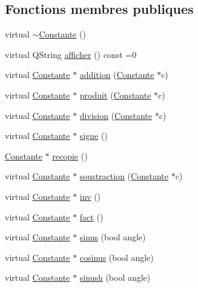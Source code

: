 \subsection*{\-Fonctions membres publiques}
\begin{DoxyCompactItemize}
\item 
virtual \hyperlink{class_constante_af747f270ad3d50813786a1b013bac959}{$\sim$\-Constante} ()
\item 
virtual \-Q\-String \hyperlink{class_constante_a78b5d9ee6a7e70349db6641a08f77479}{afficher} () const =0
\item 
virtual \hyperlink{class_constante}{\-Constante} $\ast$ \hyperlink{class_constante_a243b6eabd1fd476af827c5b523cddfac}{addition} (\hyperlink{class_constante}{\-Constante} $\ast$c)
\item 
virtual \hyperlink{class_constante}{\-Constante} $\ast$ \hyperlink{class_constante_a650e88b74d2f8a052e6a11363b3ec816}{produit} (\hyperlink{class_constante}{\-Constante} $\ast$c)
\item 
virtual \hyperlink{class_constante}{\-Constante} $\ast$ \hyperlink{class_constante_ac41fa56ac5ebdfbcc886b8d249fb876d}{division} (\hyperlink{class_constante}{\-Constante} $\ast$c)
\item 
virtual \hyperlink{class_constante}{\-Constante} $\ast$ \hyperlink{class_constante_a59fcc22949ea02eb02244dad693696aa}{signe} ()
\item 
\hyperlink{class_constante}{\-Constante} $\ast$ \hyperlink{class_constante_ac6fb071229429f82cf489f8313461efa}{recopie} ()
\item 
virtual \hyperlink{class_constante}{\-Constante} $\ast$ \hyperlink{class_constante_a3f3e5ad91d9e4eef33a5e6955fe91cb5}{soustraction} (\hyperlink{class_constante}{\-Constante} $\ast$c)
\item 
virtual \hyperlink{class_constante}{\-Constante} $\ast$ \hyperlink{class_constante_a5ea6dd472ce568576961fa78b3b674b5}{inv} ()
\item 
virtual \hyperlink{class_constante}{\-Constante} $\ast$ \hyperlink{class_constante_a96e23d33bd45f79589f8911473ef2e32}{fact} ()
\item 
virtual \hyperlink{class_constante}{\-Constante} $\ast$ \hyperlink{class_constante_a3b6827eba7936c4ce61f64da9dd826b4}{sinus} (bool angle)
\item 
virtual \hyperlink{class_constante}{\-Constante} $\ast$ \hyperlink{class_constante_af6784ed749b7f2be92d6017628e5b935}{cosinus} (bool angle)
\item 
virtual \hyperlink{class_constante}{\-Constante} $\ast$ \hyperlink{class_constante_a101b4506f71295a23c764d34b7f7ecfb}{sinush} (bool angle)

\end{DoxyCompactItemize}
